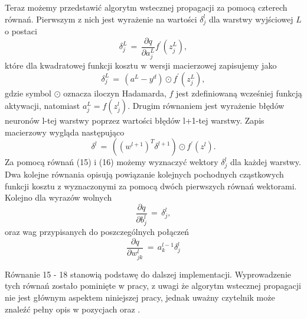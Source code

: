 \par Teraz możemy przedstawić algorytm wstecznej propagacji za pomocą czterech równań. Pierwszym z nich jest wyrażenie na wartości \(\delta_j^l \) dla warstwy wyjściowej \( L \) o postaci 
\begin{equation}
\delta_j^L \, = \, \frac{\partial q}{\partial a_j^L}f^{\prime}(z_j^L),
\end{equation}
które dla kwadratowej funkcji kosztu w wersji macierzowej zapisujemy jako
\begin{equation}
\delta_j^L \, = \, (a^L - y^d)\odot f^{\prime}(z_j^L),
\end{equation}
gdzie symbol \( \odot \) oznacza iloczyn Hadamarda, \( f \) jest zdefiniowaną wcześniej funkcją aktywacji, natomiast \( a_j^L = f(z_j^l) \). 
Drugim równaniem jest wyrażenie błędów neuronów l-tej warstwy poprzez wartości błędów l+1-tej warstwy. Zapis macierzowy wygląda następująco 
\begin{equation}
\delta^l \, = \, ((w^{l+1})^T\delta^{l+1}) \odot f^{\prime}(z^l). 
\end{equation}
Za pomocą równań (15) i (16) możemy wyznaczyć wektory \( \delta_j^l \) dla każdej warstwy. Dwa kolejne równania opisują powiązanie kolejnych pochodnych cząstkowych funkcji kosztu z wyznaczonymi za pomocą dwóch pierwszych równań wektorami. Kolejno dla wyrazów wolnych
\begin{equation}
\frac{\partial q}{\partial b_j^l} \, = \, \delta_j^l , 
\end{equation}
oraz wag przypisanych do poszczególnych połączeń
\begin{equation}
\frac{\partial q}{\partial w_{jk}^l} \, = \, a_k^{l-1}\delta _j^l
\end{equation}
\par Równanie 15 - 18 stanowią podstawę do dalszej implementacji. Wyprowadzenie tych równań zostało pominięte w pracy, z uwagi że algorytm wstecznej propagacji nie jest głównym aspektem niniejszej pracy, jednak uważny czytelnik może znaleźć pełny opis w pozycjach \cite{osowski2013} oraz \cite{nielsen2015}. 

